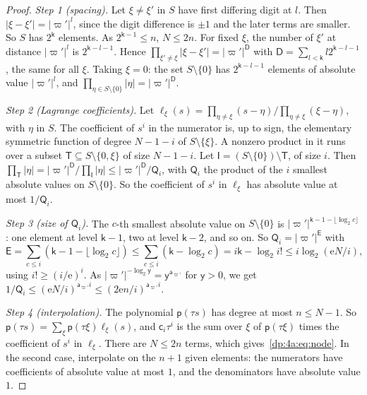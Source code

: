 \documentclass[11pt]{amsart}
\theoremstyle{definition}
\theoremstyle{remark}
\numberwithin{equation}{section}
\newcommand{\abs}[1]{\lvert #1\rvert}
\theoremstyle{plain}
\theoremstyle{definition}
\theoremstyle{plain}
\begin{document}
\begin{proof}
\emph{Step 1 (spacing).} Let $\xi\ne\xi'$ in $S$ have first differing digit at $l$. Then $\abs{\xi-\xi'}=\abs{\varpi'}^l$, since the digit difference is $\pm1$ and the later terms are smaller. So $S$ has $2^{\mathsf k}$ elements. As $2^{\mathsf k-1}\le n$, $N\le2n$. For fixed $\xi$, the number of $\xi'$ at distance $\abs{\varpi'}^l$ is $2^{\mathsf k-l-1}$. Hence $\prod_{\xi'\ne\xi}\abs{\xi-\xi'}=\abs{\varpi'}^{\mathsf D}$ with $\mathsf D=\sum_{l<\mathsf k}l2^{\mathsf k-l-1}$, the same for all $\xi$. Taking $\xi=0$: the set $S\setminus\{0\}$ has $2^{\mathsf k-l-1}$ elements of absolute value $\abs{\varpi'}^l$, and $\prod_{\eta\in S\setminus\{0\}}\abs\eta=\abs{\varpi'}^{\mathsf D}$.

\emph{Step 2 (Lagrange coefficients).} Let $\ell_\xi(s)=\prod_{\eta\ne\xi}(s-\eta)/\prod_{\eta\ne\xi}(\xi-\eta)$, with $\eta$ in $S$. The coefficient of $s^i$ in the numerator is, up to sign, the elementary symmetric function of degree $N-1-i$ of $S\setminus\{\xi\}$. A nonzero product in it runs over a subset $\mathsf T\subseteq S\setminus\{0,\xi\}$ of size $N-1-i$. Let $\mathsf I=(S\setminus\{0\})\setminus\mathsf T$, of size $i$. Then $\prod_{\mathsf T}\abs\eta=\abs{\varpi'}^{\mathsf D}/\prod_{\mathsf I}\abs\eta\le\abs{\varpi'}^{\mathsf D}/\mathsf Q_i$, with $\mathsf Q_i$ the product of the $i$ smallest absolute values on $S\setminus\{0\}$. So the coefficient of $s^i$ in $\ell_\xi$ has absolute value at most $1/\mathsf Q_i$.

\emph{Step 3 (size of $\mathsf Q_i$).} The $c$-th smallest absolute value on $S\setminus\{0\}$ is $\abs{\varpi'}^{\mathsf k-1-\lfloor\log_2c\rfloor}$: one element at level $\mathsf k-1$, two at level $\mathsf k-2$, and so on. So $\mathsf Q_i=\abs{\varpi'}^{\mathsf E}$ with
\[
 \mathsf E=\sum_{c\le i}(\mathsf k-1-\lfloor\log_2c\rfloor)\le\sum_{c\le i}(\mathsf k-\log_2c)=i\mathsf k-\log_2i!\le i\log_2(\mathrm eN/i),
\]
using $i!\ge(i/\mathrm e)^i$. As $\abs{\varpi'}^{-\log_2\mathsf y}=\mathsf y^{\mathsf a_{\varpi'}}$ for $\mathsf y>0$, we get $1/\mathsf Q_i\le(\mathrm eN/i)^{\mathsf a_{\varpi'} i}\le(2\mathrm en/i)^{\mathsf a_{\varpi'} i}$.

\emph{Step 4 (interpolation).} The polynomial $\mathsf p(\tau s)$ has degree at most $n\le N-1$. So $\mathsf p(\tau s)=\sum_\xi\mathsf p(\tau\xi)\ell_\xi(s)$, and $\mathsf c_i\tau^i$ is the sum over $\xi$ of $\mathsf p(\tau\xi)$ times the coefficient of $s^i$ in $\ell_\xi$. There are $N\le2n$ terms, which gives~\eqref{dp:4a:eq:node}. In the second case, interpolate on the $n+1$ given elements: the numerators have coefficients of absolute value at most $1$, and the denominators have absolute value $1$.
\end{proof}
\end{document}
